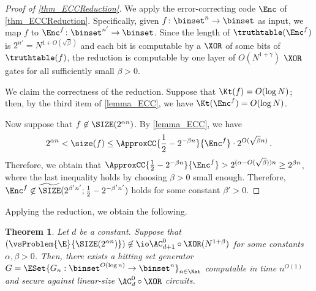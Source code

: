 \documentclass[11pt]{article}
\numberwithin{equation}{section}
\newtheorem{theorem}{Theorem}[section]
\theoremstyle{definition}
\theoremstyle{plain}
\begin{document}
\begin{proof}
  [Proof of \cref{thm_ECCReduction}]
  We apply the error-correcting code $\Enc$ of \cref{thm_ECCReduction}.
  Specifically, given $f \colon \binset^n \to \binset$ as input,
  we map $f$ to $\Enc^f \colon \binset^{n'} \to \binset$.
  Since the length of $\truthtable(\Enc^f)$ is $2^{n'} = N^{1 + O(\sqrt{\beta})}$ and each bit is computable by a $\XOR$ of some bits of $\truthtable(f)$,
  the reduction is computable by one layer of $O(N^{1 + \gamma})$ $\XOR$ gates
  for all sufficiently small $\beta > 0$.

  We claim the correctness of the reduction.
  Suppose that
  $\Kt(f) = O(\log N)$; then, by the third item of \cref{lemma_ECC}, we have $\Kt(\Enc^f) = O(\log N)$.

  Now suppose that $f \not\in \SIZE(2^{\alpha n})$.
  By \cref{lemma_ECC}, we have
  \[ 2^{\alpha n} < \size(f) \le
    \ApproxCC{\frac{1}{2} - 2^{- \beta n}}{\Enc^f} \cdot 2^{O(\sqrt{\beta} n)}\,.
  \]
  Therefore, we obtain that $\ApproxCC{\frac{1}{2} - 2^{- \beta n}}{\Enc^f} > 2^{(\alpha - O(\sqrt{\beta})) n} \ge 2^{\beta n}$,
  where the last inequality holds by choosing $\beta > 0$ small enough.
  Therefore,
  $\Enc^f \not\in \widetilde{\SIZE}(2^{\beta' n'}; \frac{1}{2} - 2^{-\beta' n'})$
  holds for some constant $\beta' > 0$.
\end{proof}

Applying the reduction, we obtain the following.
\begin{theorem}
  \label{thm_AC0XOR}
  Let $d$ be a constant.
  Suppose that
  $(\vsProblem{\E}{\SIZE (2^{\alpha n})}) \not\in \io \AC^0_{d+1} \circ \XOR (N^{1 + \beta})$
  for some constants $\alpha, \beta > 0$.
  Then,
  there exists a hitting set generator $G = \ESet{ G_n : \binset^{O(\log n)} \to \binset^n }_{n \in \Nat} $ computable in time $n^{O(1)}$ and secure against linear-size $\AC^0_{d} \circ \XOR$ circuits.
\end{theorem}
\end{document}
